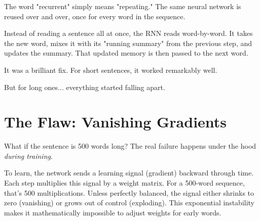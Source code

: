 \documentclass[11pt]{article}
\begin{document}
The word "recurrent" simply means "repeating." The same neural network is reused over and over, once for every word in the sequence.

\vspace{0.15in}

\begin{center}
\end{center}

\vspace{0.15in}

Instead of reading a sentence all at once, the RNN reads word-by-word. It takes the new word, mixes it with its "running summary" from the previous step, and updates the summary. That updated memory is then passed to the next word.

It was a brilliant fix. For short sentences, it worked remarkably well.

But for long ones... everything started falling apart.

\newpage

\section*{The Flaw: Vanishing Gradients}

\vspace{0.05in}

What if the sentence is 500 words long? The real failure happens under the hood \textit{during training}. 

To learn, the network sends a learning signal (gradient) backward through time. Each step multiplies this signal by a weight matrix. For a 500-word sequence, that's 500 multiplications. Unless perfectly balanced, the signal either shrinks to zero (vanishing) or grows out of control (exploding). This exponential instability makes it mathematically impossible to adjust weights for early words.
\end{document}
